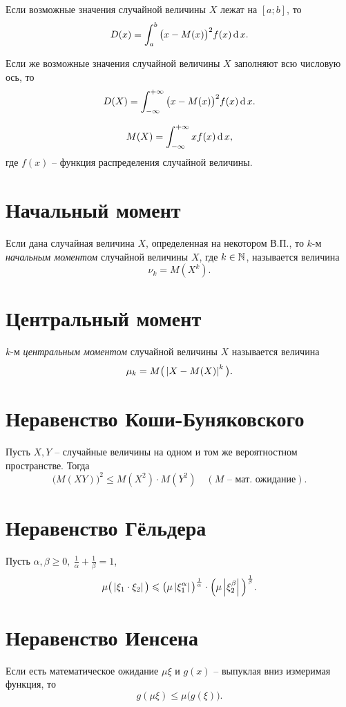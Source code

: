 Если возможные значения случайной величины $X$ лежат на $[a ; b]$, то
\[
	D(x) = \int_{a}^{b} \big(x - M(x)\big)^2 f(x) \operatorname{d} x.
\]

Если же возможные значения случайной величины $X$ заполняют всю числовую ось, то
\[
	D(X) = \int_{-\infty }^{+\infty } \big(x - M(x)\big)^2 f(x) \operatorname{d} x.
\]

\[
	M(X) = \int_{-\infty }^{+\infty } x f(x) \operatorname{d} x,
\]
где $f(x)$ -- функция распределения случайной величины.

\section{Начальный момент}

\begin{definition}
	Если дана случайная величина $X$, определенная на некотором В.П., то $k$-м \emph{начальным моментом} случайной величины $X$, где $k \in \mathbb{N}$, называется величина
	\[
		\nu _k = M(X^k).
	\]
\end{definition}

\section{Центральный момент}

\begin{definition}
	$k$-м \emph{центральным моментом} случайной величины $X$ называется величина
	\[
		\mu _k = M \big(\left\lvert X - M(X)\right\rvert ^k\big).
	\]
\end{definition}

\section{Неравенство Коши-Буняковского}

Пусть $X,Y$ -- случайные величины на одном и том же вероятностном пространстве. Тогда
\[
	\big(M(XY)\big)^2 \leqslant M(X^2) \cdot M(Y^2) \quad (M \text{ -- мат. ожидание}).
\]

\section{Неравенство Гёльдера}

Пусть $\alpha ,\beta \geqslant 0, \ \frac{1}{\alpha } + \frac{1}{\beta } =1$,
\[
	\mu \big(\left\lvert \xi _1 \cdot \xi _2\right\rvert \big)\leqslant \big(\mu \left\lvert \xi_{1}^{\alpha } \right\rvert \big)^{\frac{1}{\alpha } } \cdot \Big(\mu \left\lvert \xi_{2}^{\beta } \right\rvert \Big)^{\frac{1}{\beta } } .
\]

\section{Неравенство Иенсена}

Если есть математическое ожидание $\mu \xi $ и $g(x)$ -- выпуклая вниз измеримая функция, то
\[
	g(\mu \xi ) \leqslant  \mu \big(g(\xi )\big).
\]
